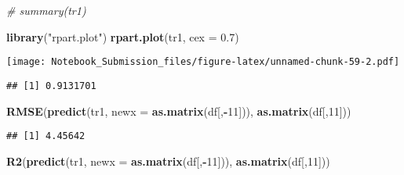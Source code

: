 \documentclass[
]{article}
\newenvironment{Shaded}{\begin{snugshade}}{\end{snugshade}}
\newcommand{\CommentTok}[1]{\textcolor[rgb]{0.56,0.35,0.01}{\textit{#1}}}
\newcommand{\DataTypeTok}[1]{\textcolor[rgb]{0.13,0.29,0.53}{#1}}
\newcommand{\DecValTok}[1]{\textcolor[rgb]{0.00,0.00,0.81}{#1}}
\newcommand{\FloatTok}[1]{\textcolor[rgb]{0.00,0.00,0.81}{#1}}
\newcommand{\KeywordTok}[1]{\textcolor[rgb]{0.13,0.29,0.53}{\textbf{#1}}}
\newcommand{\NormalTok}[1]{#1}
\newcommand{\OperatorTok}[1]{\textcolor[rgb]{0.81,0.36,0.00}{\textbf{#1}}}
\newcommand{\StringTok}[1]{\textcolor[rgb]{0.31,0.60,0.02}{#1}}
\begin{document}
\begin{Shaded}
\begin{Highlighting}[]
\CommentTok{# summary(tr1)}

\KeywordTok{library}\NormalTok{(}\StringTok{"rpart.plot"}\NormalTok{)}
\KeywordTok{rpart.plot}\NormalTok{(tr1, }\DataTypeTok{cex =} \FloatTok{0.7}\NormalTok{)}
\end{Highlighting}
\end{Shaded}

\texttt{[image: Notebook\_Submission\_files/figure-latex/unnamed-chunk-59-2.pdf]}

\begin{Shaded}
\end{Shaded}

\begin{verbatim}
## [1] 0.9131701
\end{verbatim}

\begin{Shaded}
\begin{Highlighting}[]
\KeywordTok{RMSE}\NormalTok{(}\KeywordTok{predict}\NormalTok{(tr1, }\DataTypeTok{newx =} \KeywordTok{as.matrix}\NormalTok{(df[,}\OperatorTok{-}\DecValTok{11}\NormalTok{])), }\KeywordTok{as.matrix}\NormalTok{(df[,}\DecValTok{11}\NormalTok{]))}
\end{Highlighting}
\end{Shaded}

\begin{verbatim}
## [1] 4.45642
\end{verbatim}

\begin{Shaded}
\begin{Highlighting}[]
\KeywordTok{R2}\NormalTok{(}\KeywordTok{predict}\NormalTok{(tr1, }\DataTypeTok{newx =} \KeywordTok{as.matrix}\NormalTok{(df[,}\OperatorTok{-}\DecValTok{11}\NormalTok{])), }\KeywordTok{as.matrix}\NormalTok{(df[,}\DecValTok{11}\NormalTok{]))}
\end{Highlighting}
\end{Shaded}
\end{document}
